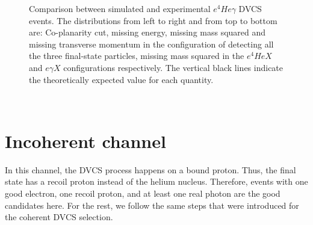 \begin{figure}[h!]
\caption{Comparison between simulated and experimental $e^{4}He\gamma$ DVCS events. The distributions from left to right and from top to bottom are: Co-planarity cut, missing energy, missing mass squared and missing transverse momentum in the configuration of detecting all the three final-state particles, missing mass squared in the $e^{4}HeX$ and $e\gamma X$ configurations respectively. The vertical black lines indicate the theoretically expected value for each quantity.} 
\label{fig:coh_comparison_with_simulation_2}
\end{figure}

  

~\newpage
~\newpage

\section{Incoherent channel}
In this channel, the DVCS process happens on a bound proton. Thus, the 
final state has a recoil proton instead of the helium nucleus. Therefore, 
events with one good electron, one recoil proton, and at least one real photon 
are the good candidates here. For the rest, we follow the same steps that were 
introduced for the coherent DVCS selection.

